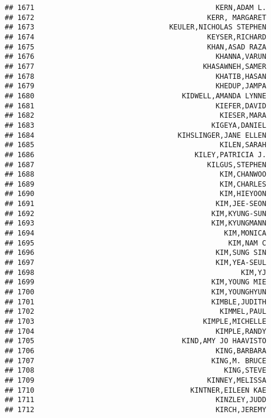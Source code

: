 \documentclass[
]{article}
\begin{document}
\begin{verbatim}
## 1671                                           KERN,ADAM L.
## 1672                                         KERR, MARGARET
## 1673                                KEULER,NICHOLAS STEPHEN
## 1674                                         KEYSER,RICHARD
## 1675                                         KHAN,ASAD RAZA
## 1676                                           KHANNA,VARUN
## 1677                                        KHASAWNEH,SAMER
## 1678                                           KHATIB,HASAN
## 1679                                           KHEDUP,JAMPA
## 1680                                   KIDWELL,AMANDA LYNNE
## 1681                                           KIEFER,DAVID
## 1682                                            KIESER,MARA
## 1683                                          KIGEYA,DANIEL
## 1684                                  KIHSLINGER,JANE ELLEN
## 1685                                            KILEN,SARAH
## 1686                                      KILEY,PATRICIA J.
## 1687                                         KILGUS,STEPHEN
## 1688                                            KIM,CHANWOO
## 1689                                            KIM,CHARLES
## 1690                                            KIM,HIEYOON
## 1691                                           KIM,JEE-SEON
## 1692                                          KIM,KYUNG-SUN
## 1693                                          KIM,KYUNGMANN
## 1694                                             KIM,MONICA
## 1695                                              KIM,NAM C
## 1696                                           KIM,SUNG SIN
## 1697                                           KIM,YEA-SEUL
## 1698                                                 KIM,YJ
## 1699                                          KIM,YOUNG MIE
## 1700                                          KIM,YOUNGHYUN
## 1701                                          KIMBLE,JUDITH
## 1702                                            KIMMEL,PAUL
## 1703                                        KIMPLE,MICHELLE
## 1704                                           KIMPLE,RANDY
## 1705                                   KIND,AMY JO HAAVISTO
## 1706                                           KING,BARBARA
## 1707                                          KING,M. BRUCE
## 1708                                             KING,STEVE
## 1709                                         KINNEY,MELISSA
## 1710                                     KINTNER,EILEEN KAE
## 1711                                           KINZLEY,JUDD
## 1712                                           KIRCH,JEREMY

\end{verbatim}
\end{document}
